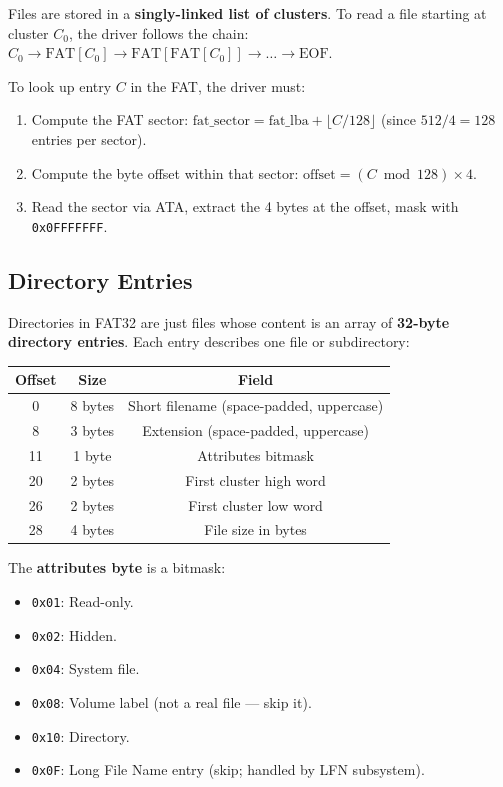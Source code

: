 \documentclass[12pt,a4paper]{report}
\begin{document}
Files are stored in a \textbf{singly-linked list of clusters}. To read a file starting
at cluster $C_0$, the driver follows the chain: $C_0 \to \text{FAT}[C_0] \to \text{FAT}[\text{FAT}[C_0]] \to \ldots \to \text{EOF}$.

To look up entry $C$ in the FAT, the driver must:
\begin{enumerate}
    \item Compute the FAT sector: $\text{fat\_sector} = \text{fat\_lba} + \lfloor C / 128 \rfloor$ (since $512/4 = 128$ entries per sector).
    \item Compute the byte offset within that sector: $\text{offset} = (C \bmod 128) \times 4$.
    \item Read the sector via ATA, extract the 4 bytes at the offset, mask with
    \texttt{0x0FFFFFFF}.
\end{enumerate}

\subsection{Directory Entries}

Directories in FAT32 are just files whose content is an array of \textbf{32-byte
directory entries}. Each entry describes one file or subdirectory:

\begin{center}
\begin{tabular}{|c|c|c|}
\hline
\textbf{Offset} & \textbf{Size} & \textbf{Field} \\
\hline
0   & 8 bytes & Short filename (space-padded, uppercase) \\
8   & 3 bytes & Extension (space-padded, uppercase) \\
11  & 1 byte  & Attributes bitmask \\
20  & 2 bytes & First cluster high word \\
26  & 2 bytes & First cluster low word \\
28  & 4 bytes & File size in bytes \\
\hline
\end{tabular}
\end{center}

The \textbf{attributes byte} is a bitmask:
\begin{itemize}
    \item \texttt{0x01}: Read-only.
    \item \texttt{0x02}: Hidden.
    \item \texttt{0x04}: System file.
    \item \texttt{0x08}: Volume label (not a real file --- skip it).
    \item \texttt{0x10}: Directory.
    \item \texttt{0x0F}: Long File Name entry (skip; handled by LFN subsystem).
\end{itemize}
\end{document}
